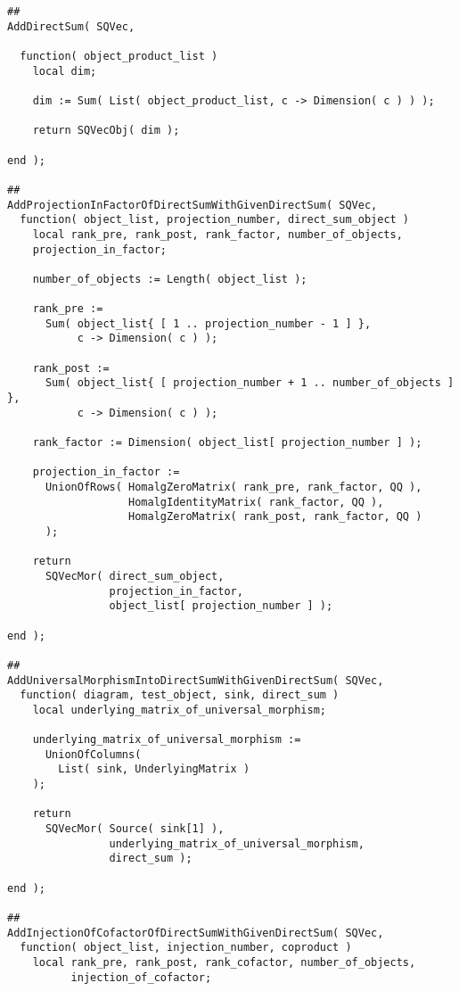 \begin{small}
\begin{Verbatim}[frame=single]
##
AddDirectSum( SQVec,

  function( object_product_list )
    local dim;
    
    dim := Sum( List( object_product_list, c -> Dimension( c ) ) );
    
    return SQVecObj( dim );
  
end );

##
AddProjectionInFactorOfDirectSumWithGivenDirectSum( SQVec,
  function( object_list, projection_number, direct_sum_object )
    local rank_pre, rank_post, rank_factor, number_of_objects,
    projection_in_factor;
    
    number_of_objects := Length( object_list );
    
    rank_pre := 
      Sum( object_list{ [ 1 .. projection_number - 1 ] },
           c -> Dimension( c ) );
    
    rank_post := 
      Sum( object_list{ [ projection_number + 1 .. number_of_objects ] },
           c -> Dimension( c ) );
    
    rank_factor := Dimension( object_list[ projection_number ] );
    
    projection_in_factor := 
      UnionOfRows( HomalgZeroMatrix( rank_pre, rank_factor, QQ ),
                   HomalgIdentityMatrix( rank_factor, QQ ),
                   HomalgZeroMatrix( rank_post, rank_factor, QQ )
      );
    
    return
      SQVecMor( direct_sum_object,
                projection_in_factor,
                object_list[ projection_number ] );
    
end );

##
AddUniversalMorphismIntoDirectSumWithGivenDirectSum( SQVec,
  function( diagram, test_object, sink, direct_sum )
    local underlying_matrix_of_universal_morphism;
    
    underlying_matrix_of_universal_morphism :=
      UnionOfColumns(
        List( sink, UnderlyingMatrix )
    );
    
    return
      SQVecMor( Source( sink[1] ), 
                underlying_matrix_of_universal_morphism, 
                direct_sum );
  
end );

##
AddInjectionOfCofactorOfDirectSumWithGivenDirectSum( SQVec,
  function( object_list, injection_number, coproduct )
    local rank_pre, rank_post, rank_cofactor, number_of_objects,
          injection_of_cofactor;
    

\end{Verbatim}
\end{small}
